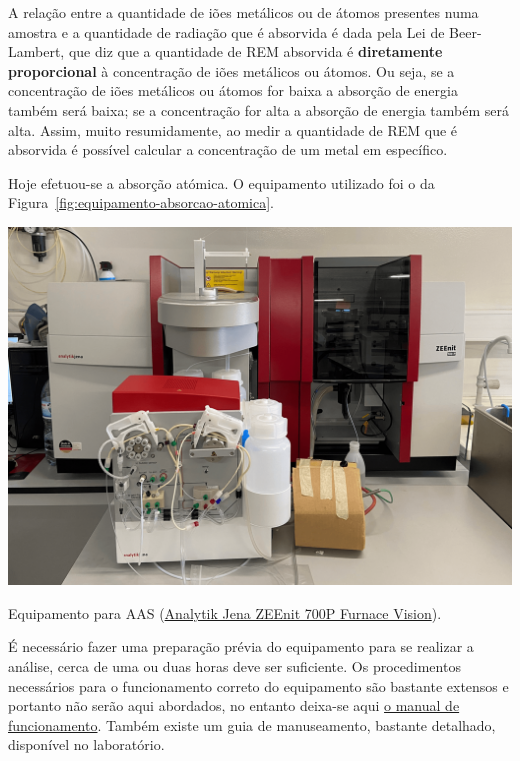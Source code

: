 A relação entre a quantidade de iões metálicos ou de átomos presentes numa amostra e a quantidade de radiação que é absorvida é dada pela Lei de Beer-Lambert, que diz que a quantidade de REM absorvida é \textbf{diretamente proporcional} à concentração de iões metálicos ou átomos.
Ou seja, se a concentração de iões metálicos ou átomos for baixa a absorção de energia também será baixa; se a concentração for alta a absorção de energia também será alta.
Assim, muito resumidamente, ao medir a quantidade de REM que é absorvida é possível calcular a concentração de um metal em específico.

\hrulefill


Hoje efetuou-se a absorção atómica.
O equipamento utilizado foi o da Figura~\ref{fig:equipamento-absorcao-atomica}.

\begin{marginfigure}[8\baselineskip]
    \centering
    \includegraphics[width=0.95\linewidth]{figures/Absorção atómica}
    \caption{Equipamento para AAS (\href{https://www.analytik-jena.com/products/chemical-analysis/elemental-analysis/aas/zeenit-series/}{Analytik Jena ZEEnit 700P Furnace Vision}).}
    \label{fig:equipamento-absorcao-atomica}
\end{marginfigure}

É necessário fazer uma preparação prévia do equipamento para se realizar a análise, cerca de uma ou duas horas deve ser suficiente.
Os procedimentos necessários para o funcionamento correto do equipamento são bastante extensos e portanto não serão aqui abordados, no entanto deixa-se aqui \href{https://www.analytik-jena.com/fileadmin/import/assets/0000006182_Manual_ZEEnit_700_P_en.pdf}{o manual de funcionamento}.
Também existe um guia de manuseamento, bastante detalhado, disponível no laboratório.


